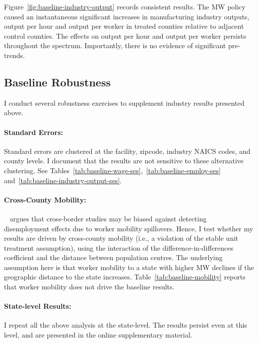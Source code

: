 \documentclass[12pt, english]{article}
\begin{document}
    Figure~\ref{fig:baseline-industry-output} records consistent results. The MW policy caused an instantaneous significant increases in manufacturing industry outputs, output per hour and output per worker in treated counties relative to adjacent control counties. The effects on output per hour and output per worker persists throughout the spectrum. Importantly, there is no evidence of significant pre-trends.
    

    \subsection{Baseline Robustness}\label{subsec:baseline-robustness}
    I conduct several robustness exercises to supplement industry results presented above.

    \paragraph{Standard Errors:} Standard errors are clustered at the facility, zipcode, industry NAICS codes, and county levels. I document that the results are not sensitive to these alternative clustering. See Tables~\ref{tab:baseline-wage-ses},~\ref{tab:baseline-employ-ses} and~\ref{tab:baseline-industry-output-ses}.

    \paragraph{Cross-County Mobility:}~\cite{neumark2019econometrics} argues that cross-border studies may be biased against detecting disemployment effects due to worker mobility spillovers. Hence, I test whether my results are driven by cross-county mobility (i.e., a violation of the stable unit treatment assumption), using the interaction of the difference-in-differences coefficient and the distance between population centres. The underlying assumption here is that worker mobility to a state with higher MW declines if the geographic distance to the state increases. Table~\ref{tab:baseline-mobility} reports that worker mobility does not drive the baseline results.

    \paragraph{State-level Results:} I repeat all the above analysis at the state-level. The results persist even at this level, and are presented in the online supplementary material.
\end{document}
